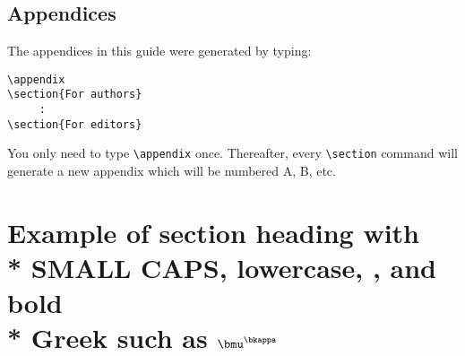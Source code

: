 \subsection{Appendices}

The appendices in this guide were generated by typing:
%
\begin{verbatim}
\appendix
\section{For authors}
     :
\section{For editors}
\end{verbatim}
%
You only need to type \verb"\appendix" once. Thereafter, every
\verb"\section" command will generate a new appendix which will be 
numbered A, B, etc. 


\section[]{Example of section heading with\\*
  S{\sevensize\bf MALL} C{\sevensize\bf APS},
  \lowercase{lowercase}, ,
  and bold\\* Greek such as
  $\bmu^{\bkappa}$}\label{headings}


